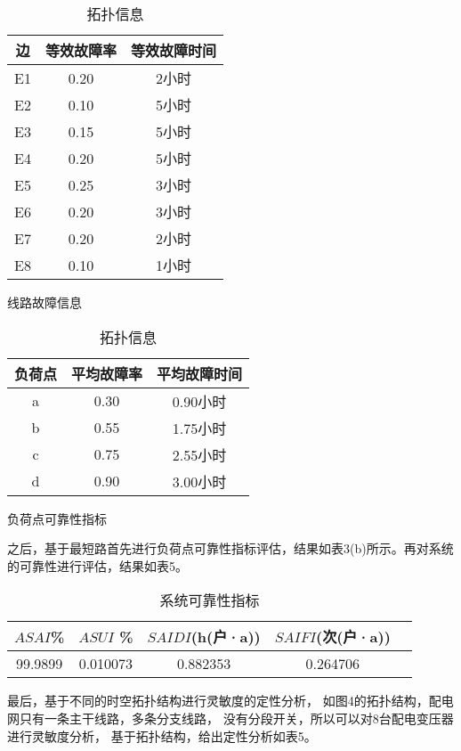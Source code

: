 \documentclass[withoutpreface,bwprint]{cumcmthesis} %
\begin{document}
\begin{table}
    \centering
    \begin{subtable}[t]{0.495\linewidth}
        \begin{tabular}{ccc}
            \toprule
            边 & 等效故障率 & 等效故障时间 \\  
            \midrule[1pt]
            E1 & 0.20 & 2小时 \\
            E2 & 0.10 & 5小时 \\
            E3 & 0.15 & 5小时 \\
            E4 & 0.20 & 5小时 \\
            E5 & 0.25 & 3小时 \\
            E6 & 0.20 & 3小时 \\
            E7 & 0.20 & 2小时 \\
            E8 & 0.10 & 1小时 \\
            \bottomrule
        \end{tabular}
        \caption{线路故障信息}
    \end{subtable}
    \begin{subtable}[t]{0.495\linewidth}
        \begin{tabular}{ccc}
            \toprule
            负荷点 & 平均故障率 & 平均故障时间 \\  
            \midrule[1pt]
            a & 0.30 & 0.90小时 \\
            b & 0.55 & 1.75小时 \\
            c & 0.75 & 2.55小时 \\
            d & 0.90 & 3.00小时 \\
            \bottomrule
        \end{tabular}
        \caption{负荷点可靠性指标}
    \end{subtable}
    \caption{拓扑信息}
    \label{tab:array}
\end{table}

之后，基于最短路首先进行负荷点可靠性指标评估，结果如表3(b)所示。再对系统的可靠性进行评估，结果如表5。

\begin{table}[!htbp]
    \caption{系统可靠性指标}\centering
    \begin{tabular}{ccccc}
        \toprule[1.5pt]
        $ASAI$\/\% & $ASUI$ \/\% & $SAIDI$\/(h\/(户·a)) & $SAIFI$\/(次\/(户·a)) \\  
        \midrule[1pt]
        99.9899 & 0.010073 & 0.882353 & 0.264706 \\
        \bottomrule[1.5pt]
    \end{tabular}
\end{table}
最后，基于不同的时空拓扑结构进行灵敏度的定性分析，
如图4的拓扑结构，配电网只有一条主干线路，多条分支线路，
没有分段开关，所以可以对8台配电变压器进行灵敏度分析，
基于拓扑结构，给出定性分析如表5。
\end{document}
